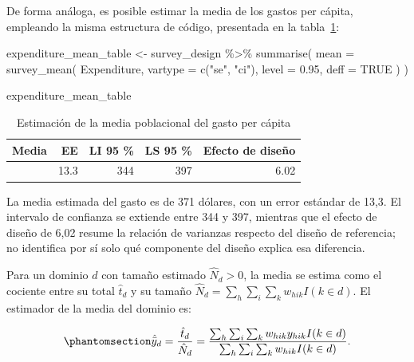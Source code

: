 \documentclass[
  spanish,
  11pt,
  letterpaper,
  oneside,
  open=any]{scrbook}
\newenvironment{Shaded}{\begin{snugshade}}{\end{snugshade}}
\newcommand{\AttributeTok}[1]{\textcolor[rgb]{0.40,0.45,0.13}{#1}}
\newcommand{\ConstantTok}[1]{\textcolor[rgb]{0.56,0.35,0.01}{#1}}
\newcommand{\FloatTok}[1]{\textcolor[rgb]{0.68,0.00,0.00}{#1}}
\newcommand{\FunctionTok}[1]{\textcolor[rgb]{0.28,0.35,0.67}{#1}}
\newcommand{\NormalTok}[1]{\textcolor[rgb]{0.00,0.23,0.31}{#1}}
\newcommand{\OtherTok}[1]{\textcolor[rgb]{0.00,0.23,0.31}{#1}}
\newcommand{\SpecialCharTok}[1]{\textcolor[rgb]{0.37,0.37,0.37}{#1}}
\newcommand{\StringTok}[1]{\textcolor[rgb]{0.13,0.47,0.30}{#1}}
\begin{document}
De forma análoga, es posible estimar la media de los gastos per cápita,
empleando la misma estructura de código, presentada en la
tabla~\ref{tbl-media-gasto}:

\begin{Shaded}
\begin{Highlighting}[]
\NormalTok{expenditure\_mean\_table }\OtherTok{\textless{}{-}}\NormalTok{ survey\_design }\SpecialCharTok{\%\textgreater{}\%}
  \FunctionTok{summarise}\NormalTok{(}
    \AttributeTok{mean =} \FunctionTok{survey\_mean}\NormalTok{(}
\NormalTok{      Expenditure,}
      \AttributeTok{vartype =} \FunctionTok{c}\NormalTok{(}\StringTok{"se"}\NormalTok{, }\StringTok{"ci"}\NormalTok{),}
      \AttributeTok{level =} \FloatTok{0.95}\NormalTok{,}
      \AttributeTok{deff =} \ConstantTok{TRUE}
\NormalTok{    )}
\NormalTok{  )}

\NormalTok{expenditure\_mean\_table}
\end{Highlighting}
\end{Shaded}

{

\begin{longtable}[]{@{}rrrrr@{}}

\caption{\label{tbl-media-gasto}Estimación de la media poblacional del
gasto per cápita}

\tabularnewline

\toprule\noalign{}
Media & EE & LI 95 \% & LS 95 \% & Efecto de diseño \\
\midrule\noalign{}
\endhead
\bottomrule\noalign{}
\endlastfoot
371 & 13.3 & 344 & 397 & 6.02 \\

\end{longtable}

}

La media estimada del gasto es de 371 dólares, con un error estándar de
13,3. El intervalo de confianza se extiende entre 344 y 397, mientras
que el efecto de diseño de 6,02 resume la relación de varianzas respecto
del diseño de referencia; no identifica por sí solo qué componente del
diseño explica esa diferencia.

Para un dominio \(d\) con tamaño estimado \(\hat{N}_d>0\), la media se
estima como el cociente entre su total \(\hat{t}_d\) y su tamaño
\(\hat{N}_d=\sum_h\sum_i\sum_k w_{hik}I(k\in d)\). El estimador de la
media del dominio es:

\begin{equation}\protect\phantomsection\label{eq-media-dominio}{
\hat{\bar{y}}_d
=\frac{\hat{t}_d}{\hat{N}_d}
=\frac{\sum_h\sum_i\sum_k w_{hik}y_{hik}I(k\in d)}
{\sum_h\sum_i\sum_k w_{hik}I(k\in d)}.
}\end{equation}
\end{document}
